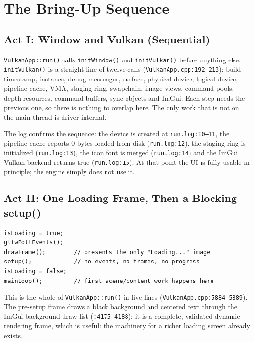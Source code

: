 \documentclass[11pt,a4paper]{article}
\begin{document}
\section{The Bring-Up Sequence}

\subsection{Act I: Window and Vulkan (Sequential)}

\texttt{VulkanApp::run()} calls \texttt{initWindow()} and
\texttt{initVulkan()} before anything else. \texttt{initVulkan()} is a
straight line of twelve calls (\texttt{VulkanApp.cpp:192--213}): build
timestamp, instance, debug messenger, surface, physical device, logical
device, pipeline cache, VMA, staging ring, swapchain, image views, command
pools, depth resources, command buffers, sync objects and ImGui. Each step
needs the previous one, so there is nothing to overlap here. The only work
that is not on the main thread is driver-internal.

The log confirms the sequence: the device is created at
\texttt{run.log:10--11}, the pipeline cache reports 0 bytes loaded from disk
(\texttt{run.log:12}), the staging ring is initialized
(\texttt{run.log:13}), the icon font is merged (\texttt{run.log:14}) and the
ImGui Vulkan backend returns true (\texttt{run.log:15}). At that point the UI
is fully usable in principle; the engine simply does not use it.

\subsection{Act II: One Loading Frame, Then a Blocking setup()}

\begin{lstlisting}
isLoading = true;
glfwPollEvents();
drawFrame();        // presents the only "Loading..." image
setup();            // no events, no frames, no progress
isLoading = false;
mainLoop();         // first scene/content work happens here
\end{lstlisting}

This is the whole of \texttt{VulkanApp::run()} in five lines
(\texttt{VulkanApp.cpp:5884--5889}). The pre-setup frame draws a black
background and centered text through the ImGui background draw list
(\texttt{:4175--4188}); it is a complete, validated dynamic-rendering frame,
which is useful: the machinery for a richer loading screen already exists.
\end{document}
